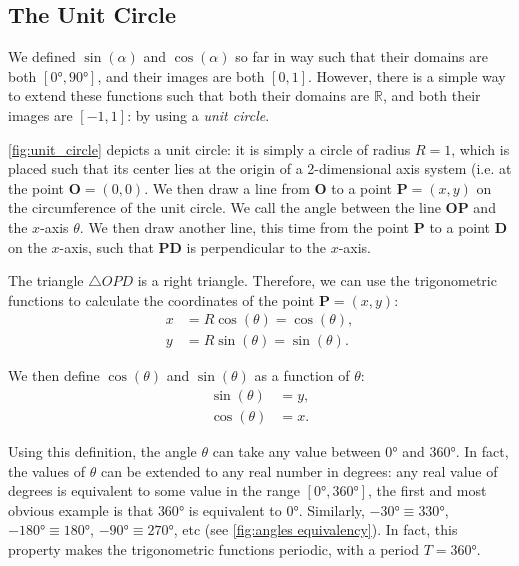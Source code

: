 \subsection{The Unit Circle}
We defined $\sin(\alpha)$ and $\cos(\alpha)$ so far in way such that their domains are both $[\ang{0},\ang{90}]$, and their images are both $[0,1]$. However, there is a simple way to extend these functions such that both their domains are $\mathbb{R}$, and both their images are $[-1,1]$: by using a \emph{unit circle}.

\autoref{fig:unit_circle} depicts a unit circle: it is simply a circle of radius $R=1$, which is placed such that its center lies at the origin of a 2-dimensional axis system (i.e. at the point $\bm{O}=(0,0)$. We then draw a line from $\bm{O}$ to a point $\bm{P}=(x,y)$ on the circumference of the unit circle. We call the angle between the line $\bm{OP}$ and the $x$-axis $\theta$. We then draw another line, this time from the point $\bm{P}$ to a point $\bm{D}$ on the $x$-axis, such that $\bm{PD}$ is perpendicular to the $x$-axis.

The triangle $\triangle OPD$ is a right triangle. Therefore, we can use the trigonometric functions to calculate the coordinates of the point $\bm{P}=(x,y)$:
\begin{align}
	x &= R\cos(\theta) = \cos(\theta),\nonumber\\
	y &= R\sin(\theta) = \sin(\theta).
	\label{eq:xy_P}
\end{align}

We then define $\cos(\theta)$ and $\sin(\theta)$ as a function of $\theta$:
\begin{align}
	\sin(\theta) &= y,\nonumber\\
	\cos(\theta) &= x.
	\label{eq:unit circle definition of sin and cos}
\end{align}

Using this definition, the angle $\theta$ can take any value between $\ang{0}$ and $\ang{360}$. In fact, the values of $\theta$ can be extended to any real number in degrees: any real value of degrees is equivalent to some value in the range $[\ang{0},\ang{360}]$, the first and most obvious example is that $\ang{360}$ is equivalent to $\ang{0}$. Similarly, $\ang{-30}\equiv\ang{330}$, $-\ang{180}\equiv\ang{180}$, $-\ang{90}\equiv\ang{270}$, etc (see \autoref{fig:angles equivalency}). In fact, this property makes the trigonometric functions periodic, with a period $T=\ang{360}$.

